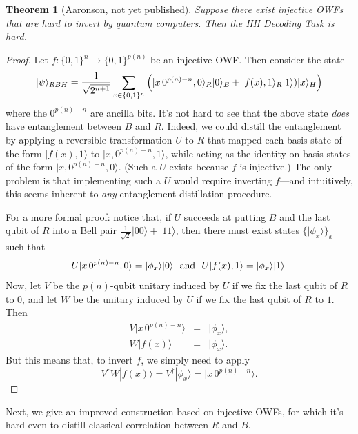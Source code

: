 \documentclass[12pt]{report}
\theoremstyle{plain}
\newtheorem{theorem}{Theorem}[section]
\theoremstyle{definition}
\renewcommand{\ket}[1]{|#1\rangle}
\begin{document}
\begin{theorem}[Aaronson, not yet published]
\label{aarfirewall}
Suppose there exist injective OWFs that are hard to invert by quantum computers.  Then the HH Decoding Task is hard.
\end{theorem}
\begin{proof}
Let $f:\{0,1\}^n\longrightarrow \{0,1\}^{p(n)}$ be an injective OWF.  Then consider the state
$$
\ket{\psi}_{RBH} = {1 \over \sqrt{2^{n+1}}} \sum_{x\in\{0,1\}^n}  \left( \ket{x \, 0^{p(n)-n},0}_R \ket{0}_B + \ket{f(x),1}_R \ket{1} ) \ket{x}_H \right)
$$
where the $0^{p(n) -n}$ are ancilla bits.  It's not hard to see that the above state {\em does} have entanglement between $B$ and $R$.  Indeed, we could distill
the entanglement by applying a reversible transformation $U$ to $R$ that mapped each basis state of the form $\ket{f(x),1}$ to $\ket{x,0^{p(n)-n},1}$, while acting as the identity on basis states of the form $\ket{x,0^{p(n)-n},0}$.  (Such a $U$ exists because $f$ is injective.)  The only problem is that implementing such a $U$
would require inverting $f$---and intuitively, this seems inherent to {\em any} entanglement distillation procedure.

For a more formal proof: notice that, if $U$ succeeds at putting $B$ and the last qubit of $R$ into a Bell pair $\frac{1}{\sqrt{2}}{\ket{00}+\ket{11}}$, then there must exist states $\{ \ket{\phi_x} \}_x$ such that
$$ U \ket{x \, 0^{p(n) -n }, 0} = \ket{\phi_x} \ket{0} \ \ {\rm and } \ \ U\ket{f(x),1} = \ket{\phi_x} \ket{1}. $$
Now, let $V$ be the $p(n)$-qubit unitary induced by $U$ if we fix the last qubit of $R$ to 0, and let $W$ be the unitary induced by $U$ if we fix the last qubit of $R$ to $1$.  Then
\begin{eqnarray}
V \ket{x \, 0^{p(n) -n}} &=& \ket{\phi_x}, \\
W \ket{f(x)} &=& \ket{\phi_x}.
\end{eqnarray}
But this means that, to invert $f$, we simply need to apply
\begin{equation}
V^\dagger W \ket{f(x)} = V^\dagger \ket{\phi_x} = \ket{x \, 0^{p(n) - n}}.
\end{equation}
\end{proof}

Next, we give an improved construction based on injective OWFs, for which it's hard even to distill classical correlation between $R$ and $B$.
\end{document}

